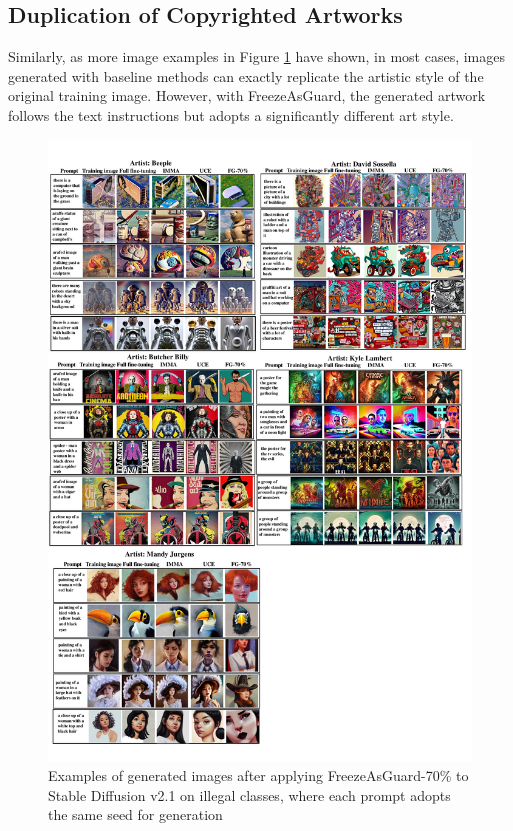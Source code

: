 \documentclass{article}
\begin{document}
\subsection{Duplication of Copyrighted Artworks}\label{sec:more_examples_artworks}
Similarly, as more image examples in Figure \ref{fig:other_qualitative_artwork} have shown, in most cases, images generated with baseline methods can exactly replicate the artistic style of the original training image. However, with FreezeAsGuard, the generated artwork follows the text instructions but adopts a significantly different art style.
\begin{figure}[ht]
	\centering
	\vspace{-0.1in}
	\includegraphics[width=0.9\linewidth]{figures/example_5artists.pdf}
	\caption{Examples of generated images after applying FreezeAsGuard-70\% to Stable Diffusion v2.1 on illegal classes, where each prompt adopts the same seed for generation}
	\label{fig:other_qualitative_artwork}
\end{figure}
\end{document}
